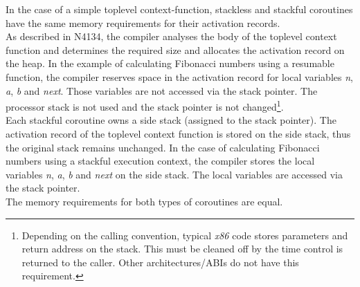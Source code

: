 \newpage
{}
In the case of a simple toplevel context-function, stackless and stackful coroutines
have the same memory requirements for their activation records.\\
\newline
As described in N4134, the compiler analyses the body of the toplevel context
function and determines the required size and allocates the activation record on
the heap.
In the example of calculating Fibonacci numbers using a resumable function, the
compiler reserves space in the activation record for local variables \emph{n},
\emph{a}, \emph{b} and \emph{next}. Those variables are not accessed via the
stack pointer. The processor stack is not used and the stack pointer is not
changed\footnote{Depending on the calling convention, typical \emph{x86} code
stores parameters and return address on the stack. This must be cleaned off by
the time control is returned to the caller. Other architectures/ABIs do
not have this requirement.}.\\
\newline
Each stackful coroutine owns a side stack (assigned to the stack pointer). The
activation record of the toplevel context function is stored on the side
stack, thus the original stack remains unchanged.
In the case of calculating Fibonacci numbers using a stackful execution
context, the compiler stores the local variables \emph{n}, \emph{a},
\emph{b} and \emph{next} on the side stack. The local variables are accessed
via the stack pointer.\\
\newline
The memory requirements for both types of coroutines are equal.

